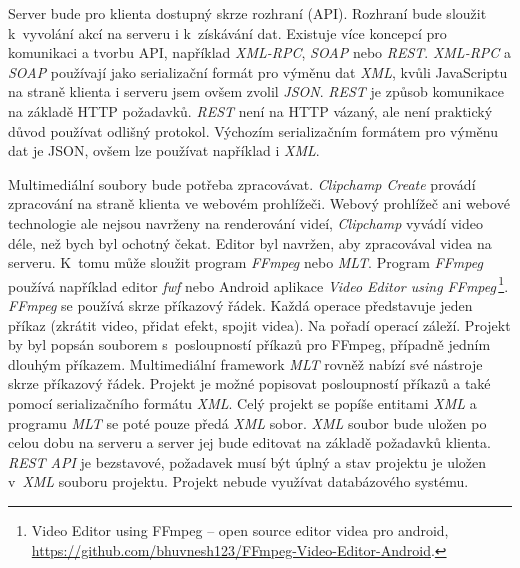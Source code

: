 Server bude pro klienta dostupný skrze rozhraní (API). Rozhraní bude sloužit k~vyvolání akcí na serveru i k~získávání dat. Existuje více koncepcí pro komunikaci a tvorbu API, například \textit{XML-RPC}, \textit{SOAP} nebo \textit{REST}. \textit{XML-RPC} a \textit{SOAP} používají jako serializační formát pro výměnu dat \textit{XML}, kvůli JavaScriptu na straně klienta i serveru jsem ovšem zvolil \textit{JSON}. \textit{REST} je způsob komunikace na základě HTTP požadavků. \textit{REST} není na HTTP vázaný, ale není praktický důvod používat odlišný protokol. Výchozím serializačním formátem pro výměnu dat je JSON, ovšem lze používat například i \textit{XML}.

Multimediální soubory bude potřeba zpracovávat. \textit{Clipchamp Create} provádí zpracování na straně klienta ve webovém prohlížeči. Webový prohlížeč ani webové technologie ale nejsou navrženy na renderování videí, \textit{Clipchamp} vyvádí video déle, než bych byl ochotný čekat. Editor byl navržen, aby zpracovával videa na serveru. K~tomu může sloužit program \textit{FFmpeg} nebo \textit{MLT}. Program \textit{FFmpeg} používá například editor \textit{fwf} nebo Android aplikace \textit{Video Editor using FFmpeg}\,\footnote{Video Editor using FFmpeg -- open source editor videa pro android, \url{https://github.com/bhuvnesh123/FFmpeg-Video-Editor-Android}.}. \textit{FFmpeg} se používá skrze příkazový řádek. Každá operace představuje jeden příkaz (zkrátit video, přidat efekt, spojit videa). Na pořadí operací záleží. Projekt by byl popsán souborem s~posloupností příkazů pro FFmpeg, případně jedním dlouhým příkazem. Multimediální framework \textit{MLT} rovněž nabízí své nástroje skrze příkazový řádek. Projekt je možné popisovat posloupností příkazů a také pomocí serializačního formátu \textit{XML}. Celý projekt se popíše entitami \textit{XML} a programu \textit{MLT} se poté pouze předá \textit{XML} sobor. \textit{XML} soubor bude uložen po celou dobu na serveru a server jej bude editovat na základě požadavků klienta. \textit{REST API} je bezstavové, požadavek musí být úplný a stav projektu je uložen v~\textit{XML} souboru projektu. Projekt nebude využívat databázového systému.

